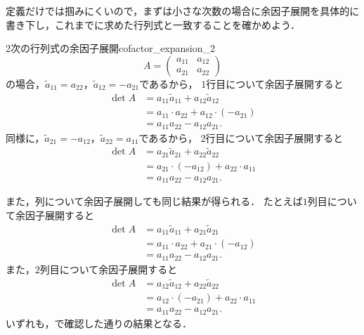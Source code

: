 定義だけでは掴みにくいので，まずは小さな次数の場合に余因子展開を具体的に書き下し，これまでに求めた行列式と一致することを確かめよう．

\begin{example}{2次の行列式の余因子展開}{cofactor_expansion_2}
  \[
  A = \begin{pmatrix}
    a_{11} & a_{12} \\
    a_{21} & a_{22}
  \end{pmatrix}
  \]
  の場合，$\tilde{a}_{11} = a_{22}$，$\tilde{a}_{12} = -a_{21}$であるから，
  $1$行目について余因子展開すると
  \begin{align*}
    \det A
    &= a_{11}\tilde{a}_{11} + a_{12}\tilde{a}_{12} \\
    &= a_{11}\cdot a_{22} + a_{12}\cdot(-a_{21}) \\
    &= a_{11}a_{22} - a_{12}a_{21}.
  \end{align*}
  同様に，$\tilde{a}_{21} = -a_{12}$，$\tilde{a}_{22} = a_{11}$であるから，
  $2$行目について余因子展開すると
  \begin{align*}
    \det A
    &= a_{21}\tilde{a}_{21} + a_{22}\tilde{a}_{22} \\
    &= a_{21}\cdot(-a_{12}) + a_{22}\cdot a_{11} \\
    &= a_{11}a_{22} - a_{12}a_{21}.
  \end{align*}

  また，列について余因子展開しても同じ結果が得られる．
  たとえば$1$列目について余因子展開すると
  \begin{align*}
    \det A
    &= a_{11}\tilde{a}_{11} + a_{21}\tilde{a}_{21} \\
    &= a_{11}\cdot a_{22} + a_{21}\cdot(-a_{12}) \\
    &= a_{11}a_{22} - a_{12}a_{21}.
  \end{align*}
  また，$2$列目について余因子展開すると
  \begin{align*}
    \det A
    &= a_{12}\tilde{a}_{12} + a_{22}\tilde{a}_{22} \\
    &= a_{12}\cdot(-a_{21}) + a_{22}\cdot a_{11} \\
    &= a_{11}a_{22} - a_{12}a_{21}.
  \end{align*}
  いずれも，で確認した通りの結果となる．
\end{example}

